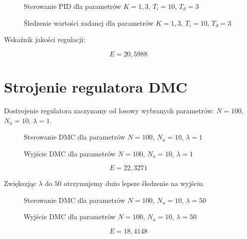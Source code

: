 \begin{figure}[H]
\centering

\caption{Sterowanie PID dla parametrów $K = 1,3$, $T_i = 10$, $T_d = 3$}
\end{figure}

\begin{figure}[H]
\centering

\caption{Śledzenie wartości zadanej dla parametrów $K = 1,3$, $T_i = 10$, $T_d = 3$}
\end{figure}

Wskaźnik jakości regulacji:

\begin{equation}
E = 20,5988
\end{equation}

\section{Strojenie regulatora DMC}

Dostrojenie regulatora zaczynamy od losowy wybranych parametrów: $N=100$, $N_u=10$, $\lambda=1$.


\begin{figure}[H]
\centering

\caption{Sterowanie DMC dla parametrów $N=100$, $N_u=10$, $\lambda=1$}
\end{figure}

\begin{figure}[H]
\centering

\caption{Wyjście DMC dla parametrów $N=100$, $N_u=10$, $\lambda=1$}
\end{figure}

\begin{equation}
E = 22,3271
\end{equation}

Zwiększjąc $\lambda$ do $50$ otrzymujemy dużo lepsze śledzenie na wyjściu.


\begin{figure}[H]
\centering

\caption{Sterowanie DMC dla parametrów $N=100$, $N_u=10$, $\lambda=50$}
\end{figure}

\begin{figure}[H]
\centering

\caption{Wyjście DMC dla parametrów $N=100$, $N_u=10$, $\lambda=50$}
\end{figure}

\begin{equation}
E = 18,4148
\end{equation}

